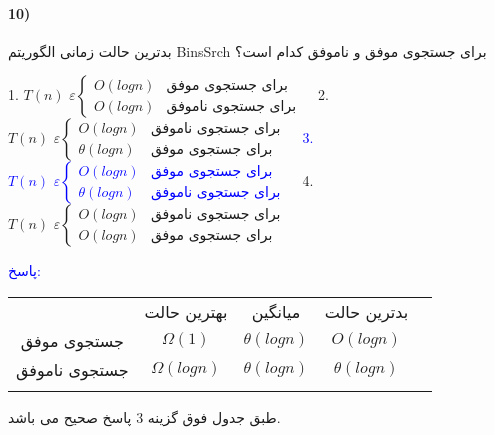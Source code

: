 \documentclass[10pt,a4paper]{article}
\begin{document}
	\paragraph{10)} بدترین حالت زمانی الگوریتم BinsSrch برای جستجوی موفق و ناموفق کدام است؟
	\begin{flushright} 
		1.\,\,$
		T(n) \,\,\varepsilon
		\begin{cases}
			O(logn) & \text{برای جستجوی موفق}\\
			O(logn) & \text{برای جستجوی ناموفق}
		\end{cases}
		$\,\,\,\,\, 2.\,\,$
		T(n) \,\,\varepsilon
		\begin{cases}
		O(logn) & \text{برای جستجوی ناموفق}\\
		\theta(logn) & \text{برای جستجوی موفق}
		\end{cases}
		$\,\,\,\,\, \textcolor{blue}{3.\,\,$
		T(n) \,\,\varepsilon
		\begin{cases}
		O(logn) & \text{برای جستجوی موفق}\\
		\theta(logn) & \text{برای جستجوی ناموفق}
		\end{cases}
		$}\,\,\,\,\, 4.\,\,$
		T(n) \,\,\varepsilon
		\begin{cases}
		O(logn) & \text{برای جستجوی ناموفق}\\
		O(logn) & \text{برای جستجوی موفق}
		\end{cases}
		$
	\end{flushright}
	\begin{flushright} 
		\textcolor{blue}{پاسخ:}
		\begin{table}[]
			\begin{tabular}{ccccr}
				\cline{1-4}
				\multicolumn{1}{|c|}{}              & \multicolumn{1}{c|}{بهترین حالت} & \multicolumn{1}{c|}{میانگین} & \multicolumn{1}{c|}{بدترین حالت} &  \\ \cline{1-4}
				\multicolumn{1}{|c|}{جستجوی موفق}   & \multicolumn{1}{c|}{$\Omega(1)$}         & \multicolumn{1}{c|}{$\theta(logn)$}  & \multicolumn{1}{c|}{$O(logn)$}      &  \\ \cline{1-4}
				\multicolumn{1}{|c|}{جستجوی ناموفق} & \multicolumn{1}{c|}{$\Omega(logn)$}      & \multicolumn{1}{c|}{$\theta(logn)$}  & \multicolumn{1}{c|}{$\theta(logn)$}      &  \\ \cline{1-4}
				\multicolumn{1}{r}{}                & \multicolumn{1}{r}{}             & \multicolumn{1}{r}{}         & \multicolumn{1}{r}{}             & 
			\end{tabular}
		\end{table}
	طبق جدول فوق گزینه 3 پاسخ صحیح می باشد.
	\end{flushright} 
\end{document}
